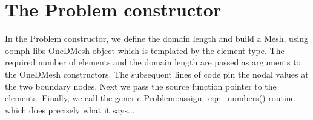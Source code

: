  

\hypertarget{index_constructor}{}\section{The Problem constructor}\label{index_constructor}
In the {\ttfamily Problem} constructor, we define the domain length and build a {\ttfamily Mesh}, using {\ttfamily oomph-\/lib\textquotesingle{}s} {\ttfamily One\+D\+Mesh} object which is templated by the element type. The required number of elements and the domain length are passed as arguments to the {\ttfamily One\+D\+Mesh} constructors. The subsequent lines of code pin the nodal values at the two boundary nodes. Next we pass the source function pointer to the elements. Finally, we call the generic {\ttfamily Problem\+::assign\+\_\+eqn\+\_\+numbers()} routine which does precisely what it says...


